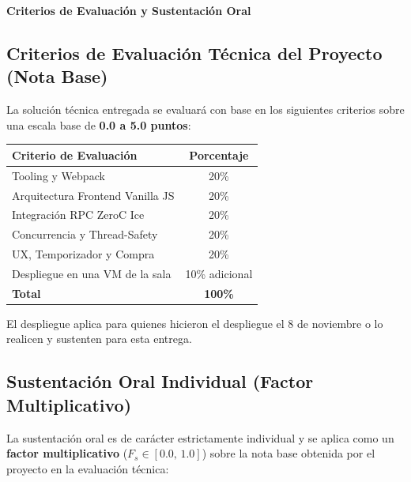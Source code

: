 \documentclass[10pt,letterpaper]{article}
\renewcommand{\arraystretch}{1.25}
\newcommand{\sectionBadge}[1]{%
  \refstepcounter{section}%
  \vspace{0.24cm}%
  \noindent%
  \colorbox{icesiBlue}{\color{white}\rule[-0.08cm]{0pt}{0.42cm}\hspace{0.16cm}\textbf{\normalsize \thesection}\hspace{0.16cm}}%
  \hspace{0.18cm}%
  {\fontsize{9.5}{12}\selectfont\textbf{\color{icesiDark}#1}}\\[-0.10cm]%
  \noindent{\color{icesiDark}\rule{\textwidth}{0.8pt}}\vspace{0.10cm}%
}
\begin{document}
\vspace{6pt}

\sectionBadge{Criterios de Evaluación y Sustentación Oral}

\subsection{Criterios de Evaluación Técnica del Proyecto (Nota Base)}
La solución técnica entregada se evaluará con base en los siguientes criterios sobre una escala base de \textbf{0.0 a 5.0 puntos}:

\vspace{2pt}
\begin{center}
\renewcommand{\arraystretch}{1.25}
\begin{tabularx}{0.75\textwidth}{|X|c|}
\hline
\rowcolor{icesiLight}
\textbf{Criterio de Evaluación} & \textbf{Porcentaje} \\
\hline
Tooling y Webpack & 20\% \\
\hline
Arquitectura Frontend Vanilla JS & 20\% \\
\hline
Integración RPC ZeroC Ice & 20\% \\
\hline
Concurrencia y Thread-Safety & 20\% \\
\hline
UX, Temporizador y Compra & 20\% \\
\hline
Despliegue en una VM de la sala & 10\% adicional \\
\hline
\rowcolor{icesiLight}
\textbf{Total} & \textbf{100\%} \\
\hline
\end{tabularx}
\end{center}

El despliegue aplica para quienes hicieron el despliegue el 8 de noviembre o lo realicen y sustenten para esta entrega.

\vspace{6pt}
\subsection{Sustentación Oral Individual (Factor Multiplicativo)}
La sustentación oral es de carácter estrictamente individual y se aplica como un \textbf{factor multiplicativo} ($F_s \in [0.0,\, 1.0]$) sobre la nota base obtenida por el proyecto en la evaluación técnica:
\end{document}
